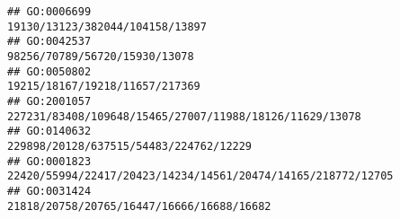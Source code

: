 \documentclass[
]{article}
\begin{document}
\begin{verbatim}
## GO:0006699                                                                                                                                                                                                                                                                                                                                                                              19130/13123/382044/104158/13897
## GO:0042537                                                                                                                                                                                                                                                                                                                                                                                98256/70789/56720/15930/13078
## GO:0050802                                                                                                                                                                                                                                                                                                                                                                               19215/18167/19218/11657/217369
## GO:2001057                                                                                                                                                                                                                                                                                                                                                      227231/83408/109648/15465/27007/11988/18126/11629/13078
## GO:0140632                                                                                                                                                                                                                                                                                                                                                                       229898/20128/637515/54483/224762/12229
## GO:0001823                                                                                                                                                                                                                                                                                                                                                 22420/55994/22417/20423/14234/14561/20474/14165/218772/12705
## GO:0031424                                                                                                                                                                                                                                                                                                                                                                    21818/20758/20765/16447/16666/16688/16682

\end{verbatim}
\end{document}
